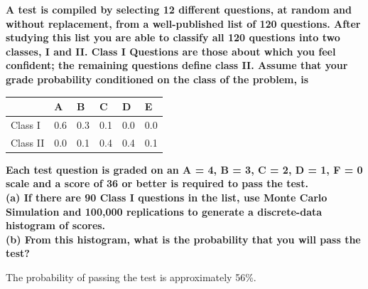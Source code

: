 \textbf{A test is compiled by selecting 12 different questions, at random and without replacement, from a well-published list of 120 questions. After studying this list you are able to classify all 120 questions into two classes, I and II. Class I Questions are those about which you feel confident; the remaining questions define class II. Assume that your grade probability conditioned on the class of the problem, is \\}
\begin{table}[h]
\centering
\begin{tabular}{l|lllll}
         & A   & B   & C   & D   & E   \\
         \hline
Class I  & 0.6 & 0.3 & 0.1 & 0.0 & 0.0 \\
Class II & 0.0 & 0.1 & 0.4 & 0.4 & 0.1
\end{tabular}
\end{table}

\noindent\textbf{Each test question is graded on an A = 4, B = 3, C = 2, D = 1, F = 0 scale and a score of 36 or better is required to pass the test.\\
(a) If there are 90 Class I questions in the list, use Monte Carlo Simulation and 100,000 replications to generate a discrete-data histogram of scores.\\
(b) From this histogram, what is the probability that you will pass the test?\\}

\noindent The probability of passing the test is approximately 56\%.\\

